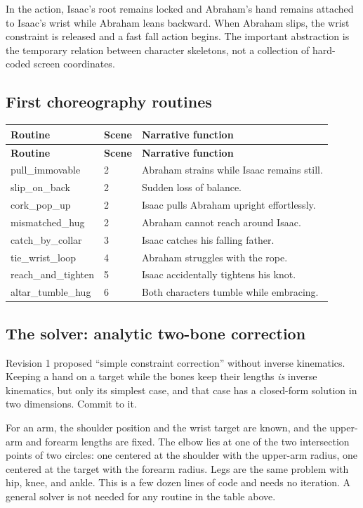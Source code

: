 \documentclass[12pt,letterpaper]{article}
\newcommand{\file}[1]{\texttt{\detokenize{#1}}}
\begin{document}
In the \file{pull_immovable} action, Isaac's root remains locked and Abraham's hand remains attached to Isaac's wrist while Abraham leans backward. When Abraham slips, the wrist constraint is released and a fast fall action begins. The important abstraction is the temporary relation between character skeletons, not a collection of hard-coded screen coordinates.

\subsection{First choreography routines}
\begin{longtable}{@{}>{\ttfamily\small}p{}p{}p{}@{}}
\toprule
\normalfont\textbf{Routine} & \textbf{Scene} & \textbf{Narrative function}\\
\midrule
\endfirsthead
\toprule
\normalfont\textbf{Routine} & \textbf{Scene} & \textbf{Narrative function}\\
\midrule
\endhead
pull\_immovable & 2 & Abraham strains while Isaac remains still.\\
slip\_on\_back & 2 & Sudden loss of balance.\\
cork\_pop\_up & 2 & Isaac pulls Abraham upright effortlessly.\\
mismatched\_hug & 2 & Abraham cannot reach around Isaac.\\
catch\_by\_collar & 3 & Isaac catches his falling father.\\
tie\_wrist\_loop & 4 & Abraham struggles with the rope.\\
reach\_and\_tighten & 5 & Isaac accidentally tightens his knot.\\
altar\_tumble\_hug & 6 & Both characters tumble while embracing.\\
\bottomrule
\end{longtable}

\subsection{The solver: analytic two-bone correction}
Revision 1 proposed ``simple constraint correction'' without inverse kinematics. Keeping a hand on a target while the bones keep their lengths \emph{is} inverse kinematics, but only its simplest case, and that case has a closed-form solution in two dimensions. Commit to it.

For an arm, the shoulder position and the wrist target are known, and the upper-arm and forearm lengths are fixed. The elbow lies at one of the two intersection points of two circles: one centered at the shoulder with the upper-arm radius, one centered at the target with the forearm radius. Legs are the same problem with hip, knee, and ankle. This is a few dozen lines of code and needs no iteration. A general solver is not needed for any routine in the table above.
\end{document}
